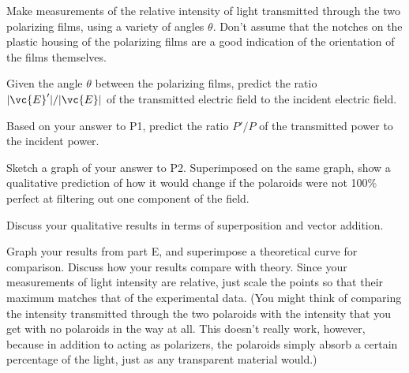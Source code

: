 Make measurements of the relative intensity of light
transmitted through the two polarizing films, using a
variety of angles $\theta $. Don't assume that the notches
on the plastic housing of the polarizing films are a good
indication of the orientation of the films themselves.

\prelab

\prelabquestion Given the angle $\theta$ between the polarizing films, predict the 
ratio $|\vc{E}'|/|\vc{E}|$ of the transmitted electric field to the incident
electric field.

\prelabquestion Based on your answer to P1, predict the ratio $P'/P$ of the transmitted
power to the incident power.

\prelabquestion Sketch a graph of your answer to P2. Superimposed on the same graph, show
a qualitative prediction of how it would change if the polaroids were not
100\% perfect at filtering out one component of the field.

\analysis

Discuss your qualitative results in terms of superposition
and vector addition.

Graph your results from part E, and superimpose a
theoretical curve for comparison. Discuss how your results
compare with theory. Since your measurements of light
intensity are relative, just scale the points so
that their maximum matches that of the experimental data. (You
might think of comparing the intensity transmitted through
the two polaroids with the intensity that you get with no
polaroids in the way at all. This doesn't really work,
however, because in addition to acting as polarizers, the
polaroids simply absorb a certain percentage of the light,
just as any transparent material would.)
